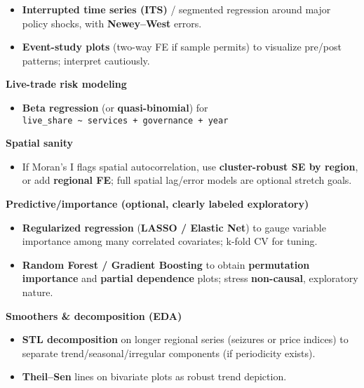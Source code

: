 \documentclass[
]{article}
\providecommand{\tightlist}{%
  \setlength{\itemsep}{0pt}\setlength{\parskip}{0pt}}
\begin{document}
\begin{itemize}
\tightlist
\item
  \textbf{Interrupted time series (ITS)} / segmented regression around
  major policy shocks, with \textbf{Newey--West} errors.
\item
  \textbf{Event-study plots} (two-way FE if sample permits) to visualize
  pre/post patterns; interpret cautiously.
\end{itemize}

\textbf{Live-trade risk modeling}

\begin{itemize}
\tightlist
\item
  \textbf{Beta regression} (or \textbf{quasi-binomial}) for
  \texttt{live\_share\ \textasciitilde{}\ services\ +\ governance\ +\ year}
\end{itemize}

\textbf{Spatial sanity}

\begin{itemize}
\tightlist
\item
  If Moran's I flags spatial autocorrelation, use \textbf{cluster-robust
  SE by region}, or add \textbf{regional FE}; full spatial lag/error
  models are optional stretch goals.
\end{itemize}

\textbf{Predictive/importance (optional, clearly labeled exploratory)}

\begin{itemize}
\tightlist
\item
  \textbf{Regularized regression} (\textbf{LASSO / Elastic Net}) to
  gauge variable importance among many correlated covariates; k-fold CV
  for tuning.
\item
  \textbf{Random Forest / Gradient Boosting} to obtain
  \textbf{permutation importance} and \textbf{partial dependence} plots;
  stress \textbf{non-causal}, exploratory nature.
\end{itemize}

\textbf{Smoothers \& decomposition (EDA)}

\begin{itemize}
\tightlist
\item
  \textbf{STL decomposition} on longer regional series (seizures or
  price indices) to separate trend/seasonal/irregular components (if
  periodicity exists).
\item
  \textbf{Theil--Sen} lines on bivariate plots as robust trend
  depiction.
\end{itemize}
\end{document}
